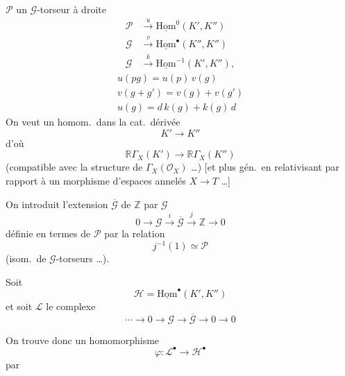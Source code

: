 \documentclass[11pt,a4paper]{article}
\begin{document}
$\mathscr{P}$ un $\mathscr{G}$-torseur à droite
\begin{align*}
  \mathscr{P} &\xrightarrow{u} \underline{\mathrm{Hom}}^0(K', K'') \\
  \mathscr{G} &\xrightarrow{v} \underline{\mathrm{Hom}}^\bullet(K'', K'') \\
  \mathscr{G} &\xrightarrow{k} \underline{\mathrm{Hom}}^{-1}(K', K'') ,
\end{align*}
\begin{gather*}
  u(pg) = u(p)\, v(g) \\
  v(g + g') = v(g) + v(g') \\
  u(g) = d\, k(g) + k(g)\, d
\end{gather*}
On veut un  homom.\ dans la cat.\ dérivée
\[
  K' \to K''
\]
d'où
\[
  \mathbb{R}\Gamma_X(K') \to \mathbb{R}\Gamma_X(K'')
\]
(compatible avec la structure de \struck{\ill{}} $\Gamma_X(\mathcal{O}_X)$ …)
[et plus gén.\ en relativisant par rapport à un morphisme d'espaces annelés
$X \to T$ …]

On introduit l'extension $\overline{\mathscr{G}}$ de $\mathbb{Z}$ par
$\mathscr{G}$
\[
  0 \to \mathscr{G} \xrightarrow{i} \overline{\mathscr{G}}
  \xrightarrow{j} \mathbb{Z} \to 0
\]
définie en termes de $\mathscr{P}$ par la relation
\[
  j^{-1}(1) \simeq \mathscr{P}
\]
(isom.\ de  $\mathscr{G}$-torseurs …).

Soit
\[
  \mathscr{H} = \underline{\mathrm{Hom}}^\bullet(K', K'')
\]
et soit $\mathscr{L}$ le complexe
\[
  \cdots \to 0 \to \mathscr{G} \to \overline{\mathscr{G}} \to 0 \to 0
\]

On trouve donc un homomorphisme
\[
  \varphi : \mathscr{L}^\bullet \to \mathscr{H}^\bullet
\]
par

\end{document}
